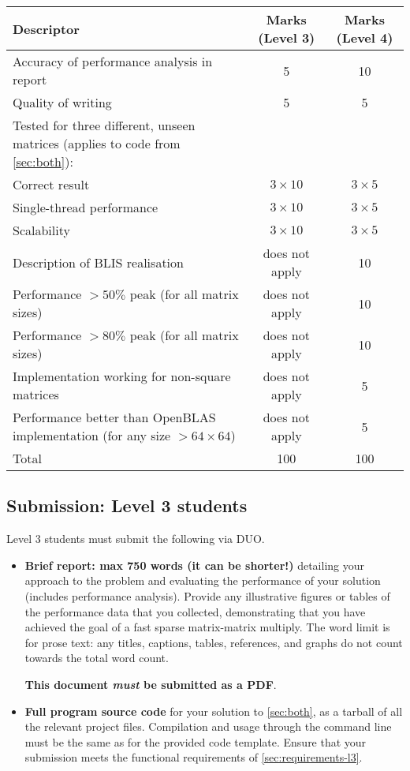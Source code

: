 \documentclass[a4paper]{article}
\begin{document}
\begin{center}
  \renewcommand\tabularxcolumn[1]{m{#1}}
  \begin{tabularx}{0.9\linewidth}{Xcc}
    \toprule
    Descriptor & Marks (Level 3) & Marks (Level 4) 
    \\
    \midrule
    Accuracy of performance analysis in report & 5 & 10 \\
    Quality of writing                         & 5 & 5 \\
    \midrule
    Tested for three different, unseen matrices (applies to code from \cref{sec:both}): \\
    Correct result & $3 \times 10 $  & $3 \times 5 $ \\
    Single-thread performance & $3 \times 10 $  & $3 \times 5 $ \\
    Scalability & $3 \times 10 $  & $3 \times 5 $ \\
    \midrule
    Description of BLIS realisation & does not apply  & 10 \\
    Performance $>50\%$ peak (for all matrix sizes) & does not apply & 10\\
    Performance $>80\%$ peak (for all matrix sizes) & does not apply & 10\\
    Implementation working for non-square matrices & does not apply & 5\\
    Performance better than OpenBLAS implementation (for any size $>64\times 64$) & does not apply & 5\\
    \midrule
    Total                                               & 100 & 100       \\
    \bottomrule
  \end{tabularx}
\end{center}

\subsection{Submission: Level 3 students}
\label{sec:submission-level-3}

Level 3 students must submit the following via DUO.
\begin{itemize}
\item \textbf{Brief report: max 750 words (it can be shorter!)}
  detailing your approach to the problem and evaluating the
  performance of your solution (includes performance analysis).
  Provide any illustrative figures or tables of the performance data
  that you collected, demonstrating that you have achieved the goal of
  a fast sparse matrix-matrix multiply.  The word limit is for prose text:
  any titles, captions, tables, references, and graphs do not count
  towards the total word count.

  \textbf{This document \emph{must} be submitted as a PDF}.

\item \textbf{Full program source code} for your solution to
  \cref{sec:both}, as a tarball of all the relevant project files.
  Compilation and usage through the command line must be the same as
  for the provided code template.  Ensure that your submission meets
  the functional requirements of \cref{sec:requirements-l3}.
\end{itemize}
\end{document}
